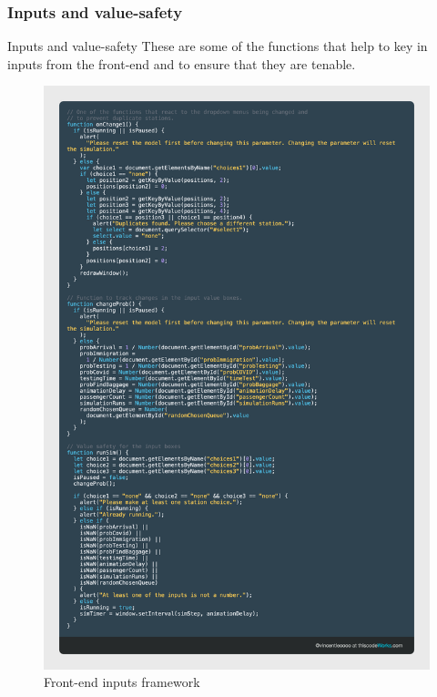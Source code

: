\documentclass{beamer}
\begin{document}
\subsubsection*{Inputs and value-safety}
\begin{frame}{Inputs and value-safety}
	These are some of the functions that help to key in inputs from the front-end and to ensure that they are tenable.
	\begin{figure}
		\includegraphics[scale=0.06]{../img/changing-things-on-the-front-end}\caption{Front-end inputs framework}
	\end{figure}
\end{frame}
\end{document}
